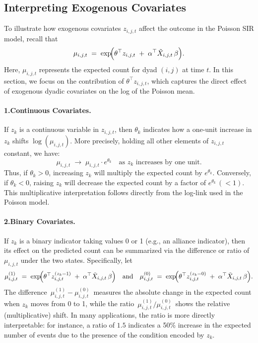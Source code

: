 \clearpage
\subsection*{Interpreting Exogenous Covariates}

To illustrate how exogenous covariates \(z_{i,j,t}\) affect the outcome in the Poisson SIR model, recall that
\[
\mu_{i,j,t} \;=\; \exp\!\Bigl(\theta^\top z_{i,j,t} \;+\;\alpha^\top \tilde{X}_{i,j,t}\,\beta\Bigr).
\]
Here, \(\mu_{i,j,t}\) represents the expected count for dyad \((i,j)\) at time \(t\). In this section, we focus on the contribution of \(\theta^\top z_{i,j,t}\), which captures the direct effect of exogenous dyadic covariates on the log of the Poisson mean.

\paragraph{1.\;\;Continuous Covariates.}
If \(z_{k}\) is a continuous variable in \(z_{i,j,t}\), then \(\theta_k\) indicates how a one-unit increase in \(z_{k}\) shifts \(\log(\mu_{i,j,t})\). More precisely, holding all other elements of \(z_{i,j,t}\) constant, we have:
\[
\mu_{i,j,t} 
\;\longrightarrow\; 
\mu_{i,j,t} \cdot e^{\theta_{k}}
\quad
\text{as } z_{k} \text{ increases by one unit}.
\]
Thus, if \(\theta_{k}>0\), increasing \(z_{k}\) will multiply the expected count by \(e^{\theta_k}\). Conversely, if \(\theta_k<0\), raising \(z_{k}\) will decrease the expected count by a factor of \(e^{\theta_k}\,(<1)\). This multiplicative interpretation follows directly from the log-link used in the Poisson model.

\paragraph{2.\;\;Binary Covariates.}
If \(z_{k}\) is a binary indicator taking values 0 or 1 (e.g., an alliance indicator), then its effect on the predicted count can be summarized via the difference or ratio of \(\mu_{i,j,t}\) under the two states. Specifically, let
\[
\mu_{i,j,t}^{(1)} \;=\; \exp\!\Bigl(\theta^\top z_{i,j,t}^{(z_{k}=1)} 
\;+\;\alpha^\top \tilde{X}_{i,j,t}\,\beta\Bigr)
\quad\text{and}\quad
\mu_{i,j,t}^{(0)} \;=\; \exp\!\Bigl(\theta^\top z_{i,j,t}^{(z_{k}=0)} 
\;+\;\alpha^\top \tilde{X}_{i,j,t}\,\beta\Bigr).
\]
The difference \(\,\mu_{i,j,t}^{(1)} - \mu_{i,j,t}^{(0)}\)\, measures the absolute change in the expected count when \(z_{k}\) moves from 0 to 1, while the ratio \(\,\mu_{i,j,t}^{(1)} / \mu_{i,j,t}^{(0)}\)\, shows the relative (multiplicative) shift. In many applications, the ratio is more directly interpretable: for instance, a ratio of \(1.5\) indicates a 50\% increase in the expected number of events due to the presence of the condition encoded by \(z_{k}\).

